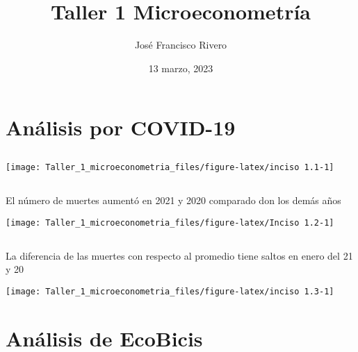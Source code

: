 \documentclass[
]{article}
\title{Taller 1 Microeconometría}
\author{José Francisco Rivero}
\date{13 marzo, 2023}
\begin{document}
\maketitle

{
\setcounter{tocdepth}{2}
\tableofcontents
}
\thispagestyle{empty}
\pagebreak
\newpage
{} 
\fancyhead[L]{\thepage}
\pagestyle{fancy}
\addtolength{\headheight}{1.0cm}
\pagestyle{fancyplain}

\hypertarget{anuxe1lisis-por-covid-19}{%
\section{Análisis por COVID-19}\label{anuxe1lisis-por-covid-19}}

\hypertarget{section}{%
\subsection{}\label{section}}

\begin{center}\texttt{[image: Taller\_1\_microeconometria\_files/figure-latex/inciso 1.1-1]} \end{center}
\pagebreak

\hypertarget{section-1}{%
\subsection{}\label{section-1}}

El número de muertes aumentó en 2021 y 2020 comparado don los demás años

\begin{center}\texttt{[image: Taller\_1\_microeconometria\_files/figure-latex/Inciso 1.2-1]} \end{center}

\pagebreak

\hypertarget{section-2}{%
\subsection{}\label{section-2}}

La diferencia de las muertes con respecto al promedio tiene saltos en
enero del 21 y 20

\begin{center}\texttt{[image: Taller\_1\_microeconometria\_files/figure-latex/inciso 1.3-1]} \end{center}

\pagebreak

\hypertarget{anuxe1lisis-de-ecobicis}{%
\section{Análisis de EcoBicis}\label{anuxe1lisis-de-ecobicis}}

\hypertarget{section-3}{%
\subsection{}\label{section-3}}
\end{document}
